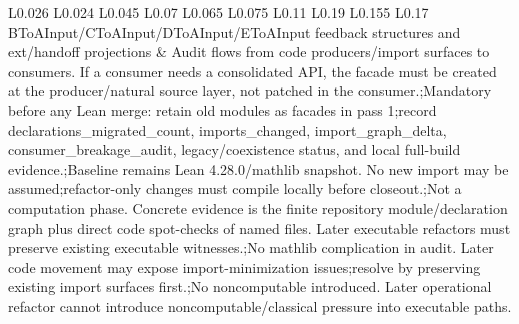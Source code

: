 \begin{longtable}{L{0.026\linewidth} L{0.024\linewidth} L{0.045\linewidth} L{0.07\linewidth} L{0.065\linewidth} L{0.075\linewidth} L{0.11\linewidth} L{0.19\linewidth} L{0.155\linewidth} L{0.17\linewidth}}
BToAInput/\allowbreak{}CToAInput/\allowbreak{}DToAInput/\allowbreak{}EToAInput feedback structures and ext/\allowbreak{}handoff projections & Audit flows from code producers/\allowbreak{}import surfaces to consumers. If a consumer needs a consolidated API, the facade must be created at the producer/\allowbreak{}natural source layer, not patched in the consumer.;\newline Mandatory before any Lean merge: retain old modules as facades in pass 1;\newline record declarations\_migrated\_count, imports\_changed, import\_graph\_delta, consumer\_breakage\_audit, legacy/\allowbreak{}coexistence status, and local full-build evidence.;\newline Baseline remains Lean 4.28.0/\allowbreak{}mathlib snapshot. No new import may be assumed;\newline refactor-only changes must compile locally before closeout.;\newline Not a computation phase. Concrete evidence is the finite repository module/\allowbreak{}declaration graph plus direct code spot-checks of named files. Later executable refactors must preserve existing executable witnesses.;\newline No mathlib complication in audit. Later code movement may expose import-minimization issues;\newline resolve by preserving existing import surfaces first.;\newline No noncomputable introduced. Later operational refactor cannot introduce noncomputable/\allowbreak{}classical pressure into executable paths.\\
\hline
\addlinespace[0.24em]

\end{longtable}
